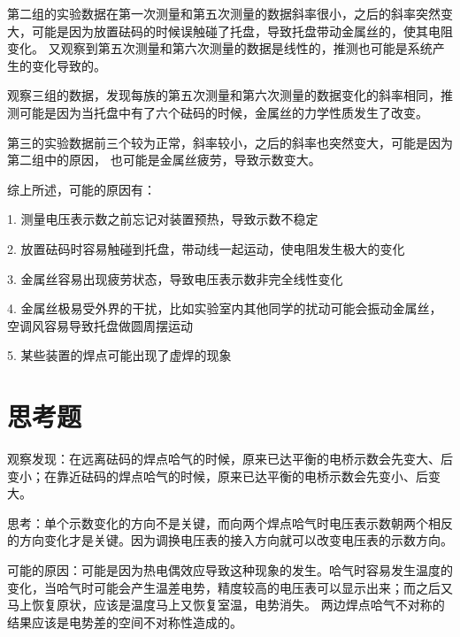 \documentclass[a4paper,UTF8]{ctexart}
\begin{document}
第二组的实验数据在第一次测量和第五次测量的数据斜率很小，之后的斜率突然变大，可能是因为放置砝码的时候误触碰了托盘，导致托盘带动金属丝的，使其电阻变化。
又观察到第五次测量和第六次测量的数据是线性的，推测也可能是系统产生的变化导致的。

观察三组的数据，发现每族的第五次测量和第六次测量的数据变化的斜率相同，推测可能是因为当托盘中有了六个砝码的时候，金属丝的力学性质发生了改变。

第三的实验数据前三个较为正常，斜率较小，之后的斜率也突然变大，可能是因为第二组中的原因，
也可能是金属丝疲劳，导致示数变大。

综上所述，可能的原因有：

1. 测量电压表示数之前忘记对装置预热，导致示数不稳定

2. 放置砝码时容易触碰到托盘，带动线一起运动，使电阻发生极大的变化

3. 金属丝容易出现疲劳状态，导致电压表示数非完全线性变化

4. 金属丝极易受外界的干扰，比如实验室内其他同学的扰动可能会振动金属丝，空调风容易导致托盘做圆周摆运动

5. 某些装置的焊点可能出现了虚焊的现象

\section{思考题}

观察发现：在远离砝码的焊点哈气的时候，原来已达平衡的电桥示数会先变大、后变小；在靠近砝码的焊点哈气的时候，原来已达平衡的电桥示数会先变小、后变大。

思考：单个示数变化的方向不是关键，而向两个焊点哈气时电压表示数朝两个相反的方向变化才是关键。因为调换电压表的接入方向就可以改变电压表的示数方向。

可能的原因：可能是因为热电偶效应导致这种现象的发生。哈气时容易发生温度的变化，当哈气时可能会产生温差电势，精度较高的电压表可以显示出来；而之后又马上恢复原状，应该是温度马上又恢复室温，电势消失。
两边焊点哈气不对称的结果应该是电势差的空间不对称性造成的。
\end{document}
